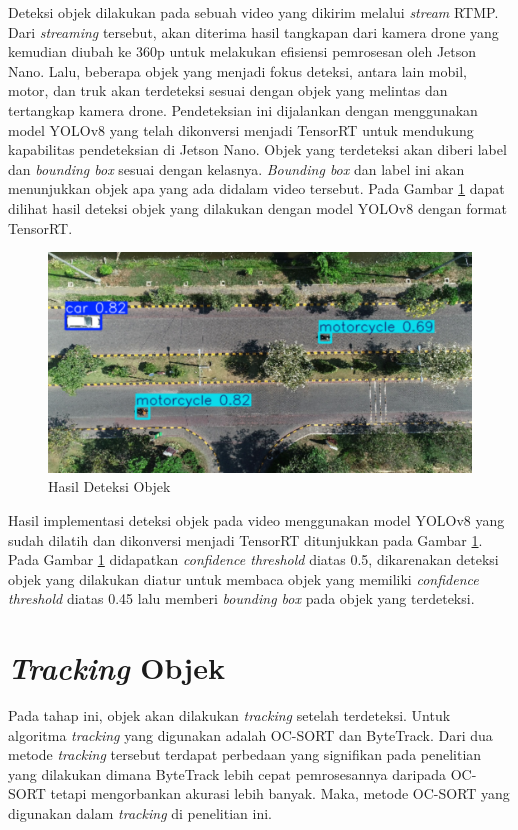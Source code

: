 Deteksi objek dilakukan pada sebuah video yang dikirim melalui \emph{stream} RTMP. Dari \emph{streaming} tersebut, akan diterima hasil tangkapan dari kamera drone yang kemudian diubah ke 360p untuk melakukan efisiensi pemrosesan oleh Jetson Nano. Lalu, beberapa objek yang menjadi fokus deteksi, antara lain mobil, motor, dan truk akan terdeteksi sesuai dengan objek yang melintas dan tertangkap kamera drone. Pendeteksian ini dijalankan dengan menggunakan model YOLOv8 yang telah dikonversi menjadi TensorRT untuk mendukung kapabilitas pendeteksian di Jetson Nano. Objek yang terdeteksi akan diberi label dan \emph{bounding box} sesuai dengan kelasnya. \emph{Bounding box} dan label ini akan menunjukkan objek apa yang ada didalam video tersebut. Pada Gambar \ref{fig:deteksi objek} dapat dilihat hasil deteksi objek yang dilakukan dengan model YOLOv8 dengan format TensorRT.

\begin{figure} [H] \centering
  \includegraphics[scale=0.3]{bab3/deteksiobjek.png}
  \caption{Hasil Deteksi Objek}
  \label{fig:deteksi objek}
\end{figure}

Hasil implementasi deteksi objek pada video menggunakan model YOLOv8 yang sudah dilatih dan dikonversi menjadi TensorRT ditunjukkan pada Gambar \ref{fig:deteksi objek}. Pada Gambar \ref{fig:deteksi objek} didapatkan \emph{confidence threshold} diatas 0.5, dikarenakan deteksi objek yang dilakukan diatur untuk membaca objek yang memiliki \emph{confidence threshold} diatas 0.45 lalu memberi \emph{bounding box} pada objek yang terdeteksi.

\section{\emph{Tracking} Objek}
Pada tahap ini, objek akan dilakukan \emph{tracking} setelah terdeteksi. Untuk algoritma \emph{tracking} yang digunakan adalah OC-SORT dan ByteTrack. Dari dua metode \emph{tracking} tersebut terdapat perbedaan yang signifikan pada penelitian yang dilakukan dimana ByteTrack lebih cepat pemrosesannya daripada OC-SORT tetapi mengorbankan akurasi lebih banyak. Maka, metode OC-SORT yang digunakan dalam \emph{tracking} di penelitian ini.

